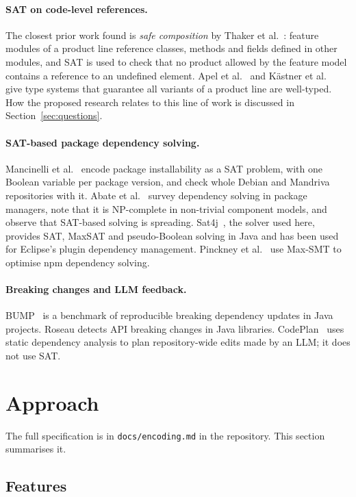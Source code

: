 \documentclass[11pt,a4paper]{article}
\newcommand{\code}[1]{\texttt{#1}}
\begin{document}
\paragraph{SAT on code-level references.}
The closest prior work found is \emph{safe composition} by Thaker et
al.~\cite{thaker2007}: feature modules of a product line reference classes,
methods and fields defined in other modules, and SAT is used to check that
no product allowed by the feature model contains a reference to an
undefined element. Apel et al.~\cite{apel2010} and K\"astner et
al.~\cite{kaestner2012} give type systems that guarantee all variants of a
product line are well-typed. How the proposed research relates to this
line of work is discussed in Section~\ref{sec:questions}.

\paragraph{SAT-based package dependency solving.}
Mancinelli et al.~\cite{mancinelli2006} encode package installability as a
SAT problem, with one Boolean variable per package version, and check
whole Debian and Mandriva repositories with it. Abate et
al.~\cite{abate2020} survey dependency solving in package managers, note
that it is NP-complete in non-trivial component models, and observe that
SAT-based solving is spreading. Sat4j~\cite{leberre2010}, the solver used
here, provides SAT, MaxSAT and pseudo-Boolean solving in Java and has been
used for Eclipse's plugin dependency management. Pinckney et
al.~\cite{pinckney2023} use Max-SMT to optimise npm dependency solving.

\paragraph{Breaking changes and LLM feedback.}
BUMP~\cite{reyes2024} is a benchmark of reproducible breaking dependency
updates in Java projects. Roseau
\cite{latappy2025} detects API breaking changes in Java libraries.
CodePlan~\cite{bairi2023} uses static dependency analysis to plan
repository-wide edits made by an LLM; it does not use SAT.

\section{Approach}

The full specification is in \code{docs/encoding.md} in the repository.
This section summarises it.

\subsection{Features}
\end{document}
